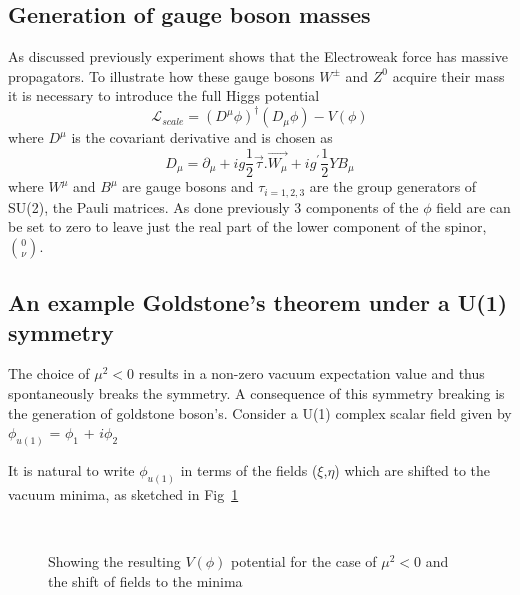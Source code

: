 \subsection{Generation of gauge boson masses}


As discussed previously experiment shows that the Electroweak force has massive propagators. To illustrate how these gauge bosons $W^{\pm}$ and $Z^{0}$ acquire their mass it is necessary to introduce the full Higgs potential
\begin{equation}
\mathcal{L}_{scale} = (D^{\mu}\phi)^{\dagger}(D_{\mu}\phi) - V(\phi)
\end{equation}
where $D^{\mu}$ is the covariant derivative and is chosen as %
\begin{equation}
  D_{\mu} = \partial_{\mu}+ig\frac{1}{2}\vec{\tau}.\vec{W_{\mu}} + ig^{'}\frac{1}{2}YB_{\mu}
  \label{eq:higgscodev}
\end{equation}
where $W^{\mu}$ and $B^{\mu}$ are gauge bosons and $\tau_{i = 1,2,3}$ are the group generators of SU(2), the Pauli matrices. As done previously 3 components of the $\phi$ field are can be set to zero to leave just the real part of the lower component of the spinor, $\binom{0}{\nu}$.
\subsection{An example Goldstone's theorem under a  U(1) symmetry}
The choice of $\mu^{2} < 0$ results in a non-zero vacuum expectation value and thus spontaneously breaks the symmetry. %
A consequence of this symmetry breaking is the generation of goldstone boson's. Consider a U(1) complex scalar field given by
$\phi_{u(1)}$ = $\phi_{1}$ + $i\phi_{2}$

It is natural to write $\phi_{u(1)}$ in terms of the fields ($\xi$,$\eta$) which are shifted to the vacuum minima, as sketched in Fig~\ref{fig:higgs}
\begin{figure}[ht!]
  \centering
  \\
           \caption{Showing \protect{} the resulting $V(\phi)$ potential for the case of $\mu^{2}<0$ and \protect{} the shift of fields to the minima}
           \label{fig:higgs}
\end{figure}



